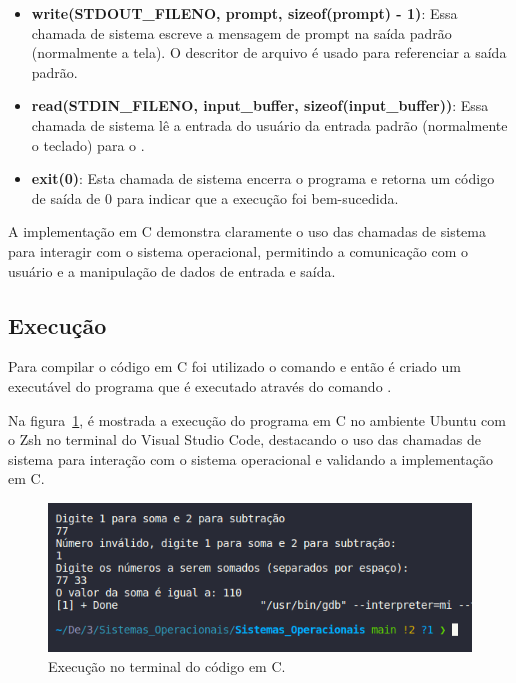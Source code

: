 \documentclass[
	12pt,				%
	openright,			%
	oneside,			%
	a4paper,			%
	chapter=TITLE,		%
	english,			%
	french,				%
	spanish,			%
	brazil				%
	]{abntex2}
\theoremstyle{definition}
\begin{document}
\begin{itemize}
    \item \textbf{write(STDOUT\_FILENO, prompt, sizeof(prompt) - 1)}: Essa chamada de sistema 
	escreve a mensagem de prompt na saída padrão (normalmente a tela). O descritor de arquivo 
	 é usado para referenciar a saída padrão.

    \item \textbf{read(STDIN\_FILENO, input\_buffer, sizeof(input\_buffer))}: Essa chamada de 
	sistema lê a entrada do usuário da entrada padrão (normalmente o teclado) para o .

    \item \textbf{exit(0)}: Esta chamada de sistema encerra o programa e retorna um código de 
	saída de 0 para indicar que a execução foi bem-sucedida.

\end{itemize}

A implementação em C demonstra claramente o uso das chamadas de sistema para interagir com o 
sistema operacional, permitindo a comunicação com o usuário e a manipulação de dados de entrada e saída.

\subsection{Execução}

Para compilar o código em C foi utilizado o comando 
e então é criado um executável do programa que é executado
através do comando .

Na figura~\ref{fig:run_c}, é mostrada a execução do programa em C no ambiente Ubuntu com o Zsh no terminal do Visual Studio 
Code, destacando o uso das chamadas de sistema para interação com o sistema operacional e validando a implementação em C.

\begin{figure}
    \centering
    \includegraphics[width=1.0\textwidth]{imagens/run_c.png}
	\caption{Execução no terminal do código em C.}
	\label{fig:run_c}
\end{figure}
\end{document}
